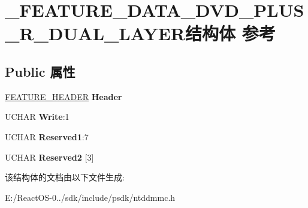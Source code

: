 \hypertarget{struct___f_e_a_t_u_r_e___d_a_t_a___d_v_d___p_l_u_s___r___d_u_a_l___l_a_y_e_r}{}\section{\+\_\+\+F\+E\+A\+T\+U\+R\+E\+\_\+\+D\+A\+T\+A\+\_\+\+D\+V\+D\+\_\+\+P\+L\+U\+S\+\_\+\+R\+\_\+\+D\+U\+A\+L\+\_\+\+L\+A\+Y\+E\+R结构体 参考}
\label{struct___f_e_a_t_u_r_e___d_a_t_a___d_v_d___p_l_u_s___r___d_u_a_l___l_a_y_e_r}
\subsection*{Public 属性}
\begin{DoxyCompactItemize}
\item 
\mbox{\label{struct___f_e_a_t_u_r_e___d_a_t_a___d_v_d___p_l_u_s___r___d_u_a_l___l_a_y_e_r_a821e49adbeac9da01366a2077f82a602}} 
\hyperlink{struct___f_e_a_t_u_r_e___h_e_a_d_e_r}{F\+E\+A\+T\+U\+R\+E\+\_\+\+H\+E\+A\+D\+ER} {\bfseries Header}
\item 
\mbox{\label{struct___f_e_a_t_u_r_e___d_a_t_a___d_v_d___p_l_u_s___r___d_u_a_l___l_a_y_e_r_a09c35f2d9f84eb9b1b7952e281828e84}} 
U\+C\+H\+AR {\bfseries Write}\+:1
\item 
\mbox{\label{struct___f_e_a_t_u_r_e___d_a_t_a___d_v_d___p_l_u_s___r___d_u_a_l___l_a_y_e_r_ac2c798fd160f7a3da88f0367f6966153}} 
U\+C\+H\+AR {\bfseries Reserved1}\+:7
\item 
\mbox{\label{struct___f_e_a_t_u_r_e___d_a_t_a___d_v_d___p_l_u_s___r___d_u_a_l___l_a_y_e_r_afcc5f5899b6f3743c6edb9c821cf9222}} 
U\+C\+H\+AR {\bfseries Reserved2} \mbox{[}3\mbox{]}
\end{DoxyCompactItemize}


该结构体的文档由以下文件生成\+:\begin{DoxyCompactItemize}
\item 
E\+:/\+React\+O\+S-\/0../sdk/include/psdk/ntddmmc.\+h\end{DoxyCompactItemize}
